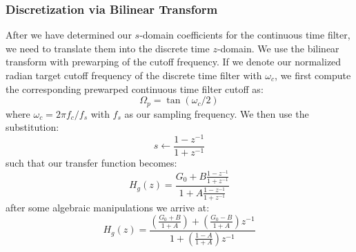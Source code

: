 \subsubsection{Discretization via Bilinear Transform}
After we have determined our $s$-domain coefficients for the continuous time filter, we need to translate them into the discrete time $z$-domain. We use the bilinear transform with prewarping of the cutoff frequency. If we denote our normalized radian target cutoff frequency of the discrete time filter with $\omega_c$, we first compute the corresponding prewarped continuous time filter cutoff as:
\begin{equation}
 \Omega_{p} = \tan(\omega_c/2)
\end{equation}
where $\omega_c = 2 \pi f_c / f_s$ with $f_s$ as our sampling frequency. We then use the substitution:
\begin{equation}
 s \leftarrow \frac{1-z^{-1}}{1+z^{-1}}
\end{equation}
such that our transfer function becomes:
\begin{equation}
 H_g(z) = \frac{G_0 + B \frac{1-z^{-1}}{1+z^{-1}}}{1 + A \frac{1-z^{-1}}{1+z^{-1}}}
\end{equation}
after some algebraic manipulations we arrive at:
\begin{equation}
 H_g(z) = \frac{ \left( \frac{G_0+B}{1+A} \right) + \left( \frac{G_0-B}{1+A} \right) z^{-1} }  
               { 1                                + \left( \frac{1-A}  {1+A} \right) z^{-1} }
\end{equation}








